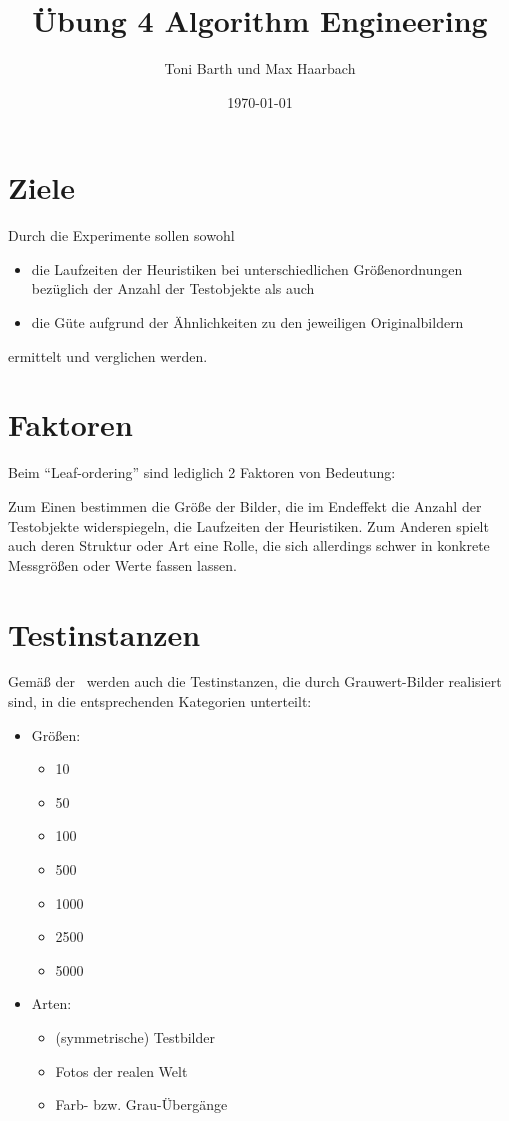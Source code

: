 \documentclass[a4paper, 10pt, twoside, onecolumn, parskip]{scrartcl}
\title{Übung 4 Algorithm Engineering} %
\author{{Toni Barth} und {Max Haarbach}} %
\date{\today}            %
\begin{document}
    \maketitle                %

    \section{Ziele} \label{sec:ziele}

    Durch die Experimente sollen sowohl
    \begin{itemize}
        \item die Laufzeiten der Heuristiken bei unterschiedlichen Größenordnungen bezüglich der Anzahl der Testobjekte als auch
        \item die Güte aufgrund der Ähnlichkeiten zu den jeweiligen Originalbildern
    \end{itemize}
    ermittelt und verglichen werden.

    \section{Faktoren} \label{sec:faktoren}

    Beim \enquote{Leaf-ordering} sind lediglich 2 Faktoren von Bedeutung:

    Zum Einen bestimmen die Größe der Bilder, die im Endeffekt die Anzahl der Testobjekte widerspiegeln, die Laufzeiten der Heuristiken.
    Zum Anderen spielt auch deren Struktur oder Art eine Rolle, die sich allerdings schwer in konkrete Messgrößen oder Werte fassen lassen.

    \section{Testinstanzen} \label{sec:testinstanzen}

    Gemäß der~ werden auch die Testinstanzen, die durch Grauwert-Bilder realisiert sind, in die entsprechenden Kategorien unterteilt:
    \begin{itemize}
        \item Größen:
        \begin{itemize}
            \item 10
            \item 50
            \item 100
            \item 500
            \item 1000
            \item 2500
            \item 5000
        \end{itemize}
        \newpage
        \item Arten:
        \begin{itemize}
            \item (symmetrische) Testbilder
            \item Fotos der realen Welt
            \item Farb- bzw. Grau-Übergänge
        \end{itemize}
    \end{itemize}
\end{document}
